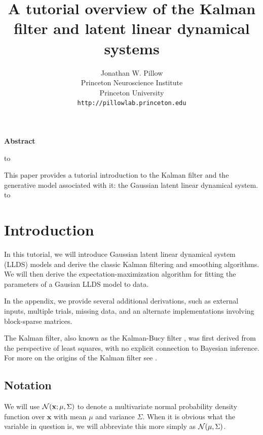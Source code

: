 \documentclass[10pt]{article}
\title{A tutorial overview of the Kalman filter and latent linear
  dynamical systems}
\author{Jonathan W. Pillow \\
  Princeton Neuroscience Institute \\
  Princeton University \\
  {\texttt{http://pillowlab.princeton.edu}}}
\newcommand{\vx}{\mathbf{x}}
\begin{document}
\maketitle

\tableofcontents
\newpage


\centerline{\textbf{Abstract}}
\hbox to \textwidth{\hrulefill} 

This paper provides a tutorial introduction to the Kalman filter and
the generative model associated with it: the Gaussian latent linear dynamical system.   
\\
\hbox to \textwidth{\hrulefill}




\section{Introduction}



In this tutorial, we will introduce Gaussian latent linear dynamical
system (LLDS) models and derive
the classic Kalman filtering and smoothing algorithms.   We will then
derive the expectation-maximization algorithm for fitting the
parameters of a Gausian LLDS model to data.

In the appendix, we provide several additional derivations, such as
external inputs, multiple trials, missing data, and an alternate implementations involving block-sparse matrices.

The Kalman filter, also known as the Kalman-Bucy filter
\cite{Kalman60,KalmanBucy1961}, was first derived from the perspective
of least squares, with no explicit connection to Bayesian inference.
For more on the origins of the Kalman filter see
\cite{SarkkaBook2013}.


\subsection{Notation}

We will use $\Nrm(\vx; \mu,\Sigma)$ to denote a multivariate normal
probability density function over $\vx$ with mean $\mu$ and variance
$\Sigma$.  When it is obvious what the variable in question is, we
will abbreviate this more simply as $\mathcal{N}(\mu,\Sigma)$. 
\end{document}

